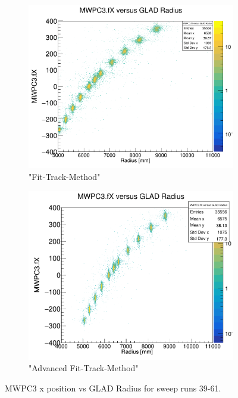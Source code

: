 \documentclass[12pt, letterpaper]{article}
\begin{document}
\begin{figure}[!htbp]
\begin{subfigure}{.5\textwidth}
\end{subfigure}
\begin{subfigure}{.5\textwidth}
  \centering
  \includegraphics[width=.9\linewidth]{plot_imgs/mw3_rho_fit.png} 
  \caption{"Fit-Track-Method"}
  \label{fig:sub-second}
\end{subfigure}
\begin{subfigure}{.5\textwidth}
  \centering
  \includegraphics[width=.9\linewidth]{plot_imgs/mw3_rho_alpha.png} 
  \caption{"Advanced Fit-Track-Method"}
  \label{fig:sub-second}
\end{subfigure}
\caption{MWPC3 x position vs GLAD Radius for sweep runs 39-61.}
\label{fig:fig}
\end{figure}
\FloatBarrier
\clearpage
\end{document}
